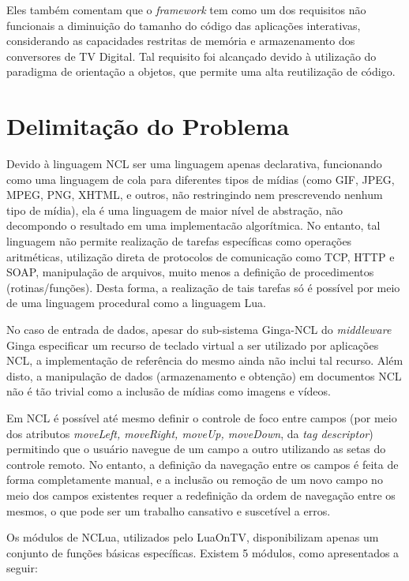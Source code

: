Eles também comentam que o \textit{framework} tem como um dos requisitos não funcionais 
a diminuição do tamanho do código das aplicações interativas, considerando
as capacidades restritas de memória e armazenamento dos conversores de TV Digital.
Tal requisito foi alcançado devido à utilização do paradigma de orientação a objetos, que
permite uma alta reutilização de código.


\section{Delimitação do Problema}

Devido à linguagem NCL ser uma linguagem apenas declarativa,
funcionando como uma linguagem de cola para diferentes tipos de mídias
(como GIF, JPEG, MPEG, PNG, XHTML, e outros, não restringindo nem prescrevendo nenhum
tipo de mídia)\cite{abnt200815606}, ela é uma linguagem de maior nível de abstração,
não decompondo o resultado em uma implementacão algorítmica\cite{barbosa2008tv}.
No entanto, tal linguagem não permite realização de tarefas específicas como
operações aritméticas, utilização direta de protocolos de comunicação como 
TCP, HTTP e SOAP, manipulação de arquivos, 
muito menos a definição de procedimentos (rotinas/funções).
Desta forma, a realização de tais tarefas só é possível por meio de uma linguagem
procedural como a linguagem Lua. 

No caso de entrada de dados, apesar do sub-sistema Ginga-NCL do \textit{middleware} Ginga especificar 
um recurso de teclado virtual a ser utilizado por aplicações NCL\cite{abnt200815606},
a implementação de referência do mesmo\cite{ginga-ncl-community} 
ainda não inclui tal recurso. 
Além disto, a manipulação de dados (armazenamento e obtenção) em documentos
NCL não é tão trivial como a inclusão de mídias como imagens e vídeos.

Em NCL é possível até mesmo definir o controle de foco entre campos
(por meio dos atributos \textit{moveLeft, moveRight, moveUp, moveDown}, da \textit{tag descriptor}\cite{abnt200815606})
permitindo que o usuário navegue de um campo a outro utilizando as setas
do controle remoto. No entanto, a definição da navegação entre os campos
é feita de forma completamente manual, e a inclusão ou remoção
de um novo campo no meio dos campos existentes requer a 
redefinição da ordem de navegação entre os mesmos, o que
pode ser um trabalho cansativo e suscetível a erros.

Os módulos de NCLua, utilizados pelo LuaOnTV, disponibilizam apenas um conjunto de funções básicas
específicas. Existem 5 módulos, como apresentados a seguir\cite{abnt200815606}:


